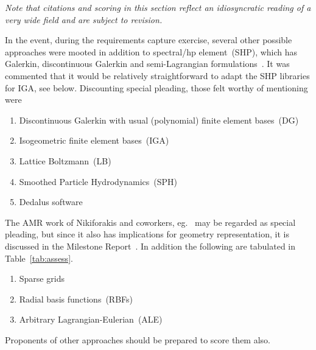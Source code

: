 \emph{Note that citations and scoring in this
section reflect an idiosyncratic reading of a very wide field 
and are subject to revision.}

In the event, during the requirements capture exercise, several other possible approaches were
mooted in addition
to spectral/hp element~(SHP), which has Galerkin, discontinuous Galerkin and semi-Lagrangian
formulations~\cite{karniadakissherwin}.
It was commented that it would be relatively straightforward to adapt the SHP libraries for IGA,
see below.
Discounting special pleading, those felt worthy of mentioning were
\begin{enumerate}
\item Discontinuous Galerkin with usual (polynomial) finite element bases~(DG)~\cite{hesthavenwarburton}
\item Isogeometric finite element bases~(IGA)~\cite{Hu18Math} %
\item Lattice Boltzmann~(LB)~\cite{Ro19Univ}
\item Smoothed Particle Hydrodynamics~(SPH)~\cite{violeau}
\item Dedalus software~\cite{Bu19Deda}
\end{enumerate}
The AMR work of Nikiforakis and coworkers, eg.~\cite{Go18dime} may be regarded as special pleading, but since it also has
implications for geometry representation, it is discussed in the Milestone Report~\cite{y1re211}.
In addition the following are tabulated in Table~\ref{tab:assess}.
\begin{enumerate}
\item Sparse grids~\cite{He03Adap,Bu04Spar}
\item Radial basis functions~(RBFs)~\cite{fornbergflyer}
\item Arbitrary Lagrangian-Eulerian~(ALE)~\cite{Do18Arbi}
\end{enumerate}
Proponents of other approaches should be prepared to score them also.

